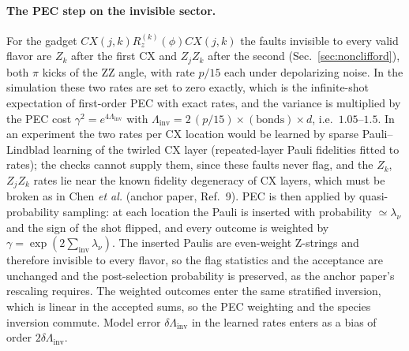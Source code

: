 \documentclass[11pt,a4paper]{article}
\theoremstyle{remark}
\newcommand{\inv}{\mathrm{inv}}
\begin{document}
\paragraph{The PEC step on the invisible sector.} For the gadget $CX(j,k)R_z^{(k)}(\phi)CX(j,k)$ the faults invisible to every valid flavor are $Z_k$ after the first CX and $Z_jZ_k$ after the second (Sec.~\ref{sec:nonclifford}), both $\pi$ kicks of the ZZ angle, with rate $p/15$ each under depolarizing noise. In the simulation these two rates are set to zero exactly, which is the infinite-shot expectation of first-order PEC with exact rates, and the variance is multiplied by the PEC cost $\gamma^2=e^{4\Lambda_\inv}$ with $\Lambda_\inv=2\,(p/15)\times(\text{bonds})\times d$, i.e.\ $1.05$--$1.5$. In an experiment the two rates per CX location would be learned by sparse Pauli--Lindblad learning of the twirled CX layer (repeated-layer Pauli fidelities fitted to rates); the checks cannot supply them, since these faults never flag, and the $Z_k$, $Z_jZ_k$ rates lie near the known fidelity degeneracy of CX layers, which must be broken as in Chen \emph{et al.} (anchor paper, Ref.~9). PEC is then applied by quasi-probability sampling: at each location the Pauli is inserted with probability $\simeq\lambda_\nu$ and the sign of the shot flipped, and every outcome is weighted by $\gamma=\exp(2\sum_\inv\lambda_\nu)$. The inserted Paulis are even-weight Z-strings and therefore invisible to every flavor, so the flag statistics and the acceptance are unchanged and the post-selection probability is preserved, as the anchor paper's rescaling requires. The weighted outcomes enter the same stratified inversion, which is linear in the accepted sums, so the PEC weighting and the species inversion commute. Model error $\delta\Lambda_\inv$ in the learned rates enters as a bias of order $2\delta\Lambda_\inv$.
\end{document}
